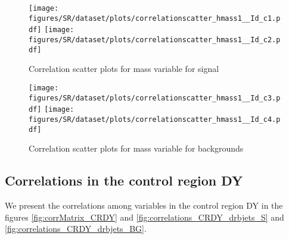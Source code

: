\begin{figure}[!htb]%
\centering
\texttt{[image: figures/SR/dataset/plots/correlationscatter\_hmass1\_\_Id\_c1.pdf]}
\texttt{[image: figures/SR/dataset/plots/correlationscatter\_hmass1\_\_Id\_c2.pdf]}
\caption{ Correlation scatter plots for \HBB mass  variable for signal}%
\label{fig:correlations_SR_hmass1_S}                                                       
\end{figure}
\clearpage

\begin{figure}[!htb]%
\centering
\texttt{[image: figures/SR/dataset/plots/correlationscatter\_hmass1\_\_Id\_c3.pdf]}
\texttt{[image: figures/SR/dataset/plots/correlationscatter\_hmass1\_\_Id\_c4.pdf]}
\caption{ Correlation scatter plots for \HBB mass variable for backgrounds}%
\label{fig:correlations_SR_hmass1_BG}                                                       
\end{figure}\clearpage
 

\subsection{Correlations in the control region DY}
We present the correlations among variables in the control region DY in the figures \ref{fig:corrMatrix_CRDY} and
\ref{fig:correlations_CRDY_drbjets_S} and \ref{fig:correlations_CRDY_drbjets_BG}.



